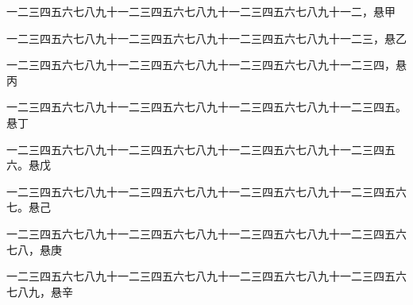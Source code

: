 \documentclass{ltc-cn-vbook}
\begin{document}
\begin{正文}
一二三四五六七八九十一二三四五六七八九十一二三四五六七八九十一二，悬甲

一二三四五六七八九十一二三四五六七八九十一二三四五六七八九十一二三，悬乙

一二三四五六七八九十一二三四五六七八九十一二三四五六七八九十一二三四，悬丙

一二三四五六七八九十一二三四五六七八九十一二三四五六七八九十一二三四五。悬丁

一二三四五六七八九十一二三四五六七八九十一二三四五六七八九十一二三四五六。悬戊

一二三四五六七八九十一二三四五六七八九十一二三四五六七八九十一二三四五六七。悬己

一二三四五六七八九十一二三四五六七八九十一二三四五六七八九十一二三四五六七八，悬庚

一二三四五六七八九十一二三四五六七八九十一二三四五六七八九十一二三四五六七八九，悬辛
\end{正文}
\end{document}
